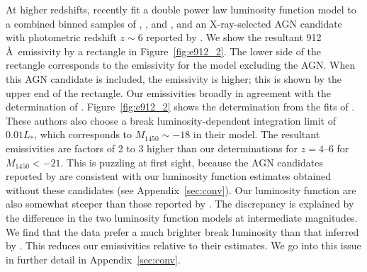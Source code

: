 \documentclass[fleqn,usenatbib]{mnras}
\begin{document}
At higher redshifts, \citet{2017ApJ...847L..15O} recently fit a double
power law luminosity function model to a combined binned samples of
\citet{2016ApJ...833..222J}, \citet{2010AJ....139..906W}, and
\citet{2015ApJ...798...28K}, and an X-ray-selected AGN candidate with
photometric redshift $z\sim 6$ reported by
\citet{2018MNRAS.474.2904P}.  We show the resultant
912\,\AA\ emissivity by a rectangle in Figure~\ref{fig:e912_2}.  The
lower side of the rectangle corresponds to the emissivity for the
\citet{2017ApJ...847L..15O} model excluding the
\citet{2018MNRAS.474.2904P} AGN.  When this AGN candidate is included,
the emissivity is higher; this is shown by the upper end of the
rectangle.  Our emissivities broadly in agreement with the
determination of \citet{2017ApJ...847L..15O}.  Figure~\ref{fig:e912_2}
shows the determination from the fits of \citet{2015AA...578A..83G}.
These authors also choose a break luminosity-dependent integration
limit of $0.01L_*$, which corresponds to $M_{1450}\sim -18$ in their
model.  The resultant emissivities are factors of 2 to 3 higher than
our determinations for $z=4$--$6$ for $M_{1450}<-21$.  This is
puzzling at first sight, because the AGN candidates reported by
\citet{2015AA...578A..83G} are consistent with our luminosity function
estimates obtained without these candidates (see
Appendix~\ref{sec:conv}).  Our luminosity function are also somewhat
steeper than those reported by \citet{2015AA...578A..83G}.  The
discrepancy is explained by the difference in the two luminosity
function models at intermediate magnitudes.  We find that the data
prefer a much brighter break luminosity than that inferred by
\citet{2015AA...578A..83G}.  This reduces our emissivities relative to
their estimates.  We go into this issue in further detail in
Appendix~\ref{sec:conv}.
\end{document}
